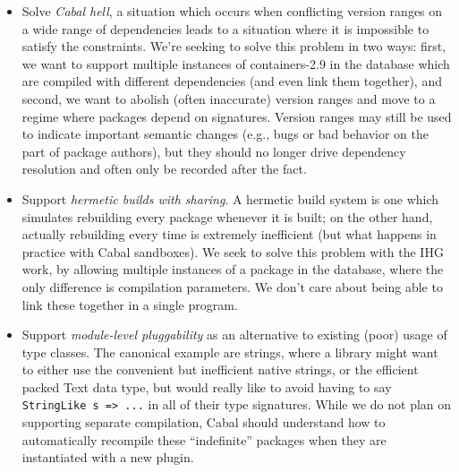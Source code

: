 \documentclass{article}
\begin{document}
\begin{itemize}
    \item Solve \emph{Cabal hell}, a situation which occurs when conflicting
        version ranges on a wide range of dependencies leads to a situation
        where it is impossible to satisfy the constraints.  We're seeking
        to solve this problem in two ways: first, we want to support
        multiple instances of containers-2.9 in the database which are
        compiled with different dependencies (and even link them
        together), and second, we want to abolish (often inaccurate)
        version ranges and move to a regime where packages depend on
        signatures.  Version ranges may still be used to indicate important
        semantic changes (e.g., bugs or bad behavior on the part of package
        authors), but they should no longer drive dependency resolution
        and often only be recorded after the fact.

    \item Support \emph{hermetic builds with sharing}.  A hermetic build
        system is one which simulates rebuilding every package whenever
        it is built; on the other hand, actually rebuilding every time
        is extremely inefficient (but what happens in practice with
        Cabal sandboxes).  We seek to solve this problem with the IHG work,
        by allowing multiple instances of a package in the database, where
        the only difference is compilation parameters.  We don't care
        about being able to link these together in a single program.

    \item Support \emph{module-level pluggability} as an alternative to
        existing (poor) usage of type classes.  The canonical example are
        strings, where a library might want to either use the convenient
        but inefficient native strings, or the efficient packed Text data
        type, but would really like to avoid having to say \verb|StringLike s => ...|
        in all of their type signatures.  While we do not plan on supporting
        separate compilation, Cabal should understand how to automatically
        recompile these ``indefinite'' packages when they are instantiated
        with a new plugin.


\end{itemize}
\end{document}
